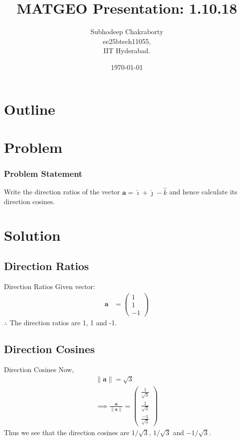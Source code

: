 \documentclass{beamer}
\title{MATGEO Presentation: 1.10.18}
\author{Subhodeep Chakraborty \\ ee25btech11055,\\IIT Hyderabad.}
\date{\today}
\theoremstyle{remark}
\providecommand{\norm}[1]{\lVert#1\rVert}
\newcommand{\myvec}[1]{\ensuremath{\begin{pmatrix}#1\end{pmatrix}}}
\let\vec\mathbf
\numberwithin{equation}{section}
\begin{document}
\begin{frame}
\titlepage
\end{frame}

\section*{Outline}
\begin{frame}
\tableofcontents
\end{frame}

\section{Problem}
\begin{frame}
\frametitle{Problem Statement}

Write the direction ratios of the vector $\vec{a} = \hat{\imath} + \hat{\jmath} - \hat{k}$ and hence calculate its direction cosines.

\end{frame}

\section{Solution}
\subsection{Direction Ratios}
\begin{frame}{Direction Ratios}
Given vector:
\begin{align}
 \vec{a} &= \myvec{1 \\ 1 \\ -1}
\end{align}
$\therefore$ The direction ratios are 1, 1 and -1.
\end{frame}

\subsection{Direction Cosines}
\begin{frame}{Direction Cosines}
Now,
\begin{align*}
\norm{\vec{a}} = \sqrt{3} \\
\implies \frac{\vec{a}}{\norm{\vec{a}}} = \myvec{\frac{1}{\sqrt{3}} \\ \frac{1}{\sqrt{3}} \\ \frac{-1}{\sqrt{3}}}
\end{align*}
Thus we see that the direction cosines are $1/\sqrt{3}$, $1/\sqrt{3}$ and $-1/\sqrt{3}$.
\end{frame}
\end{document}
